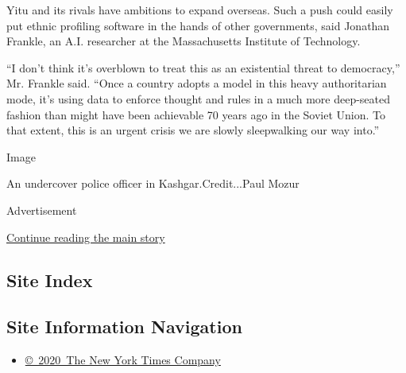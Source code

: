 Yitu and its rivals have ambitions to expand overseas. Such a push could
easily put ethnic profiling software in the hands of other governments,
said Jonathan Frankle, an A.I. researcher at the Massachusetts Institute
of Technology.

``I don't think it's overblown to treat this as an existential threat to
democracy,'' Mr. Frankle said. ``Once a country adopts a model in this
heavy authoritarian mode, it's using data to enforce thought and rules
in a much more deep-seated fashion than might have been achievable 70
years ago in the Soviet Union. To that extent, this is an urgent crisis
we are slowly sleepwalking our way into.''

Image

An undercover police officer in Kashgar.Credit...Paul Mozur

Advertisement

\protect\hyperlink{after-bottom}{Continue reading the main story}

\hypertarget{site-index}{%
\subsection{Site Index}\label{site-index}}

\hypertarget{site-information-navigation}{%
\subsection{Site Information
Navigation}\label{site-information-navigation}}

\begin{itemize}
\tightlist
\item
  \href{https://help.nytimes3xbfgragh.onion/hc/en-us/articles/115014792127-Copyright-notice}{©~2020~The
  New York Times Company}
\end{itemize}


